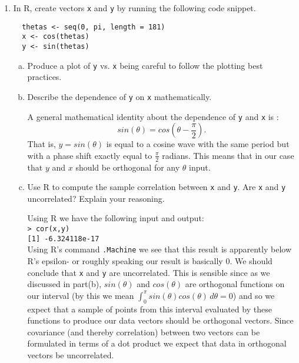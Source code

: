 \documentclass[letterpaper,12pt,fleqn]{article}
\begin{document}
\begin{enumerate}
\vspace{2em}

\item In R, create vectors \texttt{x} and \texttt{y} by running the following code snippet.

\begin{verbatim}
  thetas <- seq(0, pi, length = 181)
  x <- cos(thetas)
  y <- sin(thetas)
\end{verbatim}

\begin{enumerate}[a)]
\item Produce a plot of \texttt{y} vs. \texttt{x} being careful to follow the plotting best practices.

\item Describe the dependence of \texttt{y} on \texttt{x} mathematically.

A general mathematical identity about the dependence of \texttt{y} and \texttt{x} is : $$sin(\theta) = cos(\theta - \frac{\pi}{2}).$$
That is, $y = sin(\theta)$ is equal to a cosine wave with the same period but with a phase shift exactly equal to $\frac{\pi}{2}$ radians. This means that in our case that $y$ and $x$ should be orthogonal for any $\theta$ input. 

\item Use R to compute the sample correlation between \texttt{x} and \texttt{y}.  Are \texttt{x} and \texttt{y} uncorrelated? Explain your reasoning.

Using R we have the following input and output: \\
\texttt{> cor(x,y)} \\
\texttt{[1] -6.324118e-17}\\
Using R's command \texttt{.Machine} we see that this result is apparently below R's epsilon- or roughly speaking our result is basically 0. We should conclude that \texttt{x} and \texttt{y} are uncorrelated. This is sensible since as we discussed in part(b), $sin(\theta)$ and $cos(\theta)$ are orthogonal functions on our interval (by this we mean $\int_{0}^{\pi} sin(\theta)cos(\theta) \, d\theta = 0$) and so we expect that a sample of points from this interval evaluated by these functions to produce our data vectors should be orthogonal vectors. Since covariance (and thereby correlation) between two vectors can be formulated in terms of a dot product we expect that data in orthogonal vectors be uncorrelated.
\end{enumerate}


\vspace{2em}


\end{enumerate}
\end{document}
